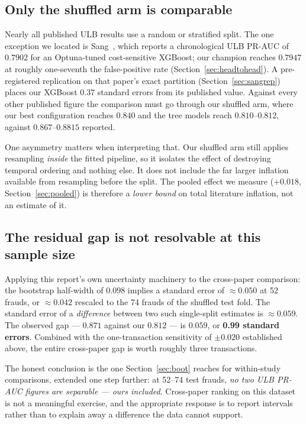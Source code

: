 \documentclass[11pt,a4paper]{article}
\begin{document}
\subsection{Only the shuffled arm is comparable}
Nearly all published ULB results use a random or stratified split. The one exception we located
is Sang~\cite{eai2026}, which reports a chronological ULB PR-AUC of $0.7902$ for an
Optuna-tuned cost-sensitive XGBoost; our champion reaches $0.7947$ at roughly one-seventh the
false-positive rate (Section~\ref{sec:headtohead}). A pre-registered replication on that
paper's exact partition (Section~\ref{sec:sangrep}) places our XGBoost $0.37$ standard errors
from its published value. Against every other published figure the
comparison must go through our shuffled arm, where our best configuration reaches $0.840$ and
the tree models reach $0.810$--$0.812$, against $0.867$--$0.8815$ reported.

One asymmetry matters when interpreting that. Our shuffled arm still applies resampling
\emph{inside} the fitted pipeline, so it isolates the effect of destroying temporal ordering and
nothing else. It does not include the far larger inflation available from resampling before the
split. The pooled effect we measure ($+0.018$, Section~\ref{sec:pooled}) is therefore a
\emph{lower bound} on total literature inflation, not an estimate of it.

\subsection{The residual gap is not resolvable at this sample size}
Applying this report's own uncertainty machinery to the cross-paper comparison: the bootstrap
half-width of $0.098$ implies a standard error of $\approx0.050$ at 52 frauds, or $\approx0.042$
rescaled to the 74 frauds of the shuffled test fold. The standard error of a \emph{difference}
between two such single-split estimates is $\approx0.059$. The observed gap --- $0.871$ against
our $0.812$ --- is $0.059$, or \textbf{0.99 standard errors}. Combined with the one-transaction
sensitivity of $\pm0.020$ established above, the entire cross-paper gap is worth roughly three
transactions.

The honest conclusion is the one Section~\ref{sec:boot} reaches for within-study comparisons,
extended one step further: at 52--74 test frauds, \emph{no two ULB PR-AUC figures are separable
--- ours included}. Cross-paper ranking on this dataset is not a meaningful exercise, and the
appropriate response is to report intervals rather than to explain away a difference the data
cannot support.
\end{document}

